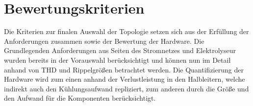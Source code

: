 \section{Bewertungskriterien}
Die Kriterien zur finalen Auswahl der Topologie setzen sich aus der Erfüllung der Anforderungen zusammen sowie der Bewertung der Hardware. Die Grundlegenden Anforderungen aus Seiten des Stromnetzes und Elektrolyseur wurden bereits in der Vorauswahl berücksichtigt und können nun im Detail anhand von \gls{THD} und Rippelgrößen betrachtet werden. Die Quantifizierung der Hardware wird zum einen anhand der Verlustleistung in den Halbleitern, welche indirekt auch den Kühlungsaufwand repliziert, zum anderen durch die Größe und den Aufwand für die Komponenten berücksichtigt.  